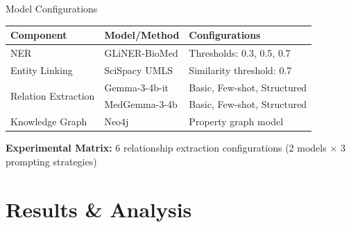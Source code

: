 \documentclass[aspectratio=169, 11pt]{beamer}
\begin{document}
\begin{frame}{Model Configurations}
    \vspace{0.5cm}
    \begin{table}[h]
        \centering
        \footnotesize
        \begin{tabular}{|l|l|l|}
        \hline
        \textbf{Component} & \textbf{Model/Method} & \textbf{Configurations} \\
        \hline
        NER & GLiNER-BioMed & Thresholds: 0.3, 0.5, 0.7 \\
        \hline
        Entity Linking & SciSpacy UMLS & Similarity threshold: 0.7 \\
        \hline
        \multirow{2}{*}{Relation Extraction} & Gemma-3-4b-it & Basic, Few-shot, Structured \\
        \cline{2-3}
         & MedGemma-3-4b & Basic, Few-shot, Structured \\
        \hline
        Knowledge Graph & Neo4j & Property graph model \\
        \hline
        \end{tabular}
    \end{table}
    
    \vspace{0.6cm}
    \textbf{Experimental Matrix:} 6 relationship extraction configurations (2 models × 3 prompting strategies)
\end{frame}

\section{Results \& Analysis}
\end{document}
